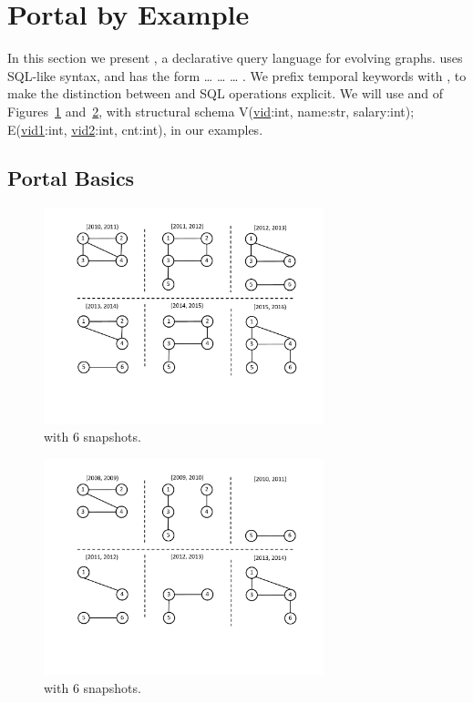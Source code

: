 \section{Portal by Example}
\label{sec:example}

In this section we present \ql, a declarative query language for
evolving graphs. \ql uses SQL-like syntax, and has the form
 \ldots {} \ldots {} \ldots
{}.  We prefix temporal keywords with , to make
the distinction between \ql and SQL operations explicit.  We will use
\tgs {} and  of Figures~\ref{fig:tg}
and~\ref{fig:tg_t2}, with structural schema V(\underline{vid}:int,
name:str, salary:int); E(\underline{vid1}:int, \underline{vid2}:int,
cnt:int), in our examples.

\subsection{Portal Basics}
\label{sec:example:basics}

\begin{figure}[t!]
\includegraphics[width=3.2in]{figs/6snaps.pdf}
\caption{\tg {} with 6 snapshots.} 
\label{fig:tg}
\end{figure}

\begin{figure}[t!]
\includegraphics[width=3.2in]{figs/t2.pdf}
\caption{\tg {} with 6 snapshots.} 
\label{fig:tg_t2}
\end{figure}

